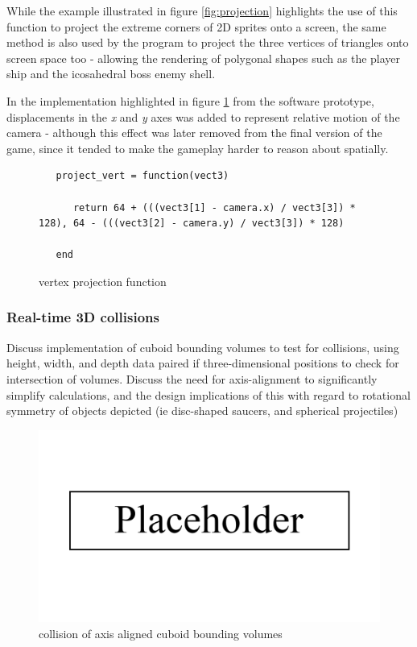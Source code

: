 \documentclass{article}
\begin{document}
While the example illustrated in figure \ref{fig:projection} highlights the use of this function
to project the extreme corners of 2D sprites onto a screen, the same method is also used by the
program to project the three vertices of triangles onto screen space too - allowing the rendering of
polygonal shapes such as the player ship and the icosahedral boss enemy shell.

In the implementation highlighted in figure \ref{fig:codeproject} from the software prototype, displacements
in the \textit{x} and \textit{y} axes was added to represent relative motion of the camera - although this
effect was later removed from the final version of the game, since it tended to make the
gameplay harder to reason about spatially.

\begin{figure}[h]
   \begin{lstlisting}
   project_vert = function(vect3)

      return 64 + (((vect3[1] - camera.x) / vect3[3]) * 128), 64 - (((vect3[2] - camera.y) / vect3[3]) * 128)

   end
   \end{lstlisting}
   \caption{vertex projection function}
   \label{fig:codeproject}
\end{figure}

\subsubsection*{Real-time 3D collisions}
Discuss implementation of cuboid bounding volumes to test for collisions, using
height, width, and depth data paired if three-dimensional positions to check for
intersection of volumes. Discuss the need for axis-alignment to significantly
simplify calculations, and the design implications of this with regard to rotational
symmetry of objects depicted (ie disc-shaped saucers, and spherical projectiles)

\begin{figure}[h]
    \centering
    \includegraphics[width=.8\textwidth]{placeholder}
    \caption{collision of axis aligned cuboid bounding volumes}
    \label{fig:collision}
\end{figure}
\end{document}
